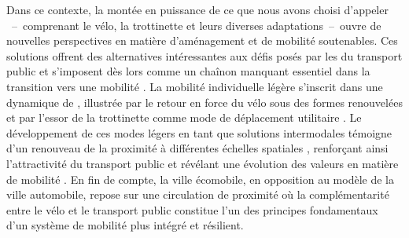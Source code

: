 \begin{refsegment}
Dans ce contexte, la montée en puissance de ce que nous avons choisi d'appeler ~–~comprenant le vélo, la trottinette et leurs diverses adaptations~–~ouvre de nouvelles perspectives en matière d’aménagement et de mobilité soutenables. Ces solutions offrent des alternatives intéressantes aux défis posés par les  du transport public et s’imposent dès lors comme un chaînon manquant essentiel dans la transition vers une mobilité  \textcolor{blue}{\autocites[4]{sebban_complementarite_2003}[25]{amar_homo_2016}{heran_transition_2018}}. La mobilité individuelle légère s’inscrit dans une dynamique de , illustrée par le retour en force du vélo sous des formes renouvelées et par l’essor de la trottinette comme mode de déplacement utilitaire \textcolor{blue}{\autocite[18]{amar_homo_2016}}. Le développement de ces modes légers en tant que solutions intermodales témoigne d’un renouveau de la proximité à différentes échelles spatiales \textcolor{blue}{\autocite{sadik-kahn_15-minute_2021}}, renforçant ainsi l’attractivité du transport public et révélant une évolution des valeurs en matière de mobilité \textcolor{blue}{\autocite[110]{goletz_intermodality_2020}}. En fin de compte, la ville écomobile, en opposition au modèle de la ville automobile, repose sur une circulation de proximité où la complémentarité entre le vélo et le transport public constitue l’un des principes fondamentaux d’un système de mobilité plus intégré et résilient.%


\end{refsegment}
